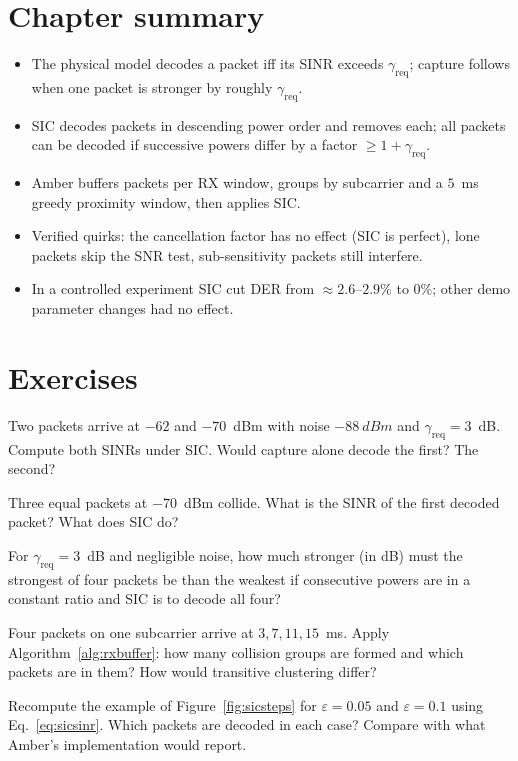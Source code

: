 \section{Chapter summary}
\begin{itemize}
 \item The physical model decodes a packet iff its SINR exceeds $\gamma_{\mathrm{req}}$; capture follows when one packet is stronger by roughly $\gamma_{\mathrm{req}}$.
 \item SIC decodes packets in descending power order and removes each; all packets can be decoded if successive powers differ by a factor $\ge1+\gamma_{\mathrm{req}}$.
 \item Amber buffers packets per RX window, groups by subcarrier and a $5$~ms greedy proximity window, then applies SIC.
 \item Verified quirks: the cancellation factor has no effect (SIC is perfect), lone packets skip the SNR test, sub-sensitivity packets still interfere.
 \item In a controlled experiment SIC cut DER from $\approx2.6$--$2.9\%$ to $0\%$; other demo parameter changes had no effect.
\end{itemize}

\section*{Exercises}
\begin{exercise}
Two packets arrive at $-62$ and $-70$~dBm with noise $\SI{-88}{dBm}$ and $\gamma_{\mathrm{req}}=3$~dB. Compute both SINRs under SIC. Would capture alone decode the first? The second?
\end{exercise}
\begin{exercise}
Three equal packets at $-70$~dBm collide. What is the SINR of the first decoded packet? What does SIC do?
\end{exercise}
\begin{exercise}
For $\gamma_{\mathrm{req}}=3$~dB and negligible noise, how much stronger (in dB) must the strongest of four packets be than the weakest if consecutive powers are in a constant ratio and SIC is to decode all four?
\end{exercise}
\begin{exercise}\label{ex:greedy}
Four packets on one subcarrier arrive at $3,7,11,15$~ms. Apply Algorithm~\ref{alg:rxbuffer}: how many collision groups are formed and which packets are in them? How would transitive clustering differ?
\end{exercise}
\begin{exercise}
Recompute the example of Figure~\ref{fig:sicsteps} for $\varepsilon=0.05$ and $\varepsilon=0.1$ using Eq.~\eqref{eq:sicsinr}. Which packets are decoded in each case? Compare with what Amber's implementation would report.
\end{exercise}

